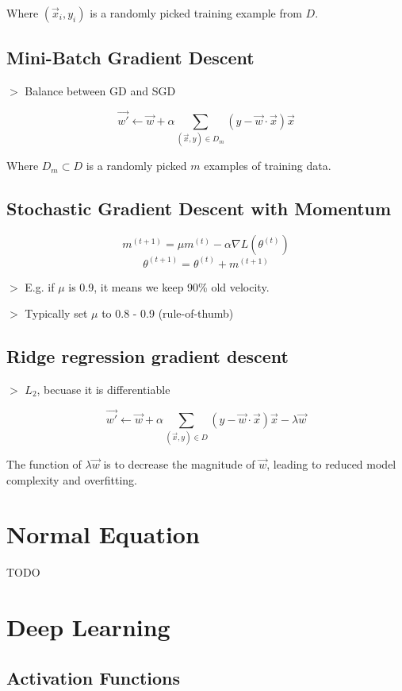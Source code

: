 \documentclass[12pt,a4paper]{article}
\newcommand{\remark}[1]{
    $>$ {\color{blue} #1}
}
\begin{document}
Where $(\vec{x}_i, y_i)$ is a randomly picked training example from $D$.

\subsection*{Mini-Batch Gradient Descent}

\remark{Balance between GD and SGD}

\[\vec{w'} \leftarrow \vec{w} + \alpha \sum_{(\vec{x},y) \in D_m}(y - \vec{w} \cdot \vec{x})\vec{x}\]

Where $D_m \subset D$ is a randomly picked $m$ examples of training data.

\subsection*{Stochastic Gradient Descent with Momentum}

\[m^{(t+1)} = \mu m^{(t)} - \alpha \nabla L(\theta^{(t)})\]
\[\theta^{(t+1)} = \theta^{(t)} + m^{(t+1)}\]

\remark{E.g. if $\mu$ is 0.9, it means we keep 90\% old velocity.}

\remark{Typically set $\mu$ to 0.8 - 0.9 (rule-of-thumb)}

\subsection*{Ridge regression gradient descent}

\remark{$L_2$, becuase it is differentiable}

\[\vec{w'} \leftarrow \vec{w} + \alpha \sum_{(\vec{x},y) \in D}(y - \vec{w} \cdot \vec{x}) \vec{x} - \lambda \vec{w}\]

The function of $\lambda \vec{w}$ is to decrease the magnitude of $\vec{w}$, leading to reduced model complexity and overfitting.

\section*{Normal Equation}

TODO

\section*{Deep Learning}

\subsection*{Activation Functions}
\end{document}
